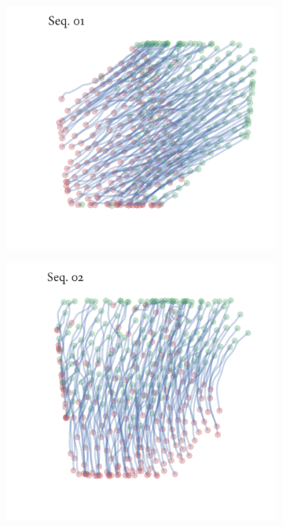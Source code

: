 \begin{figure}[h]
	\begin{subfigure}[t]{0.5\textwidth}
		\centering
		\includegraphics{streamline_sequence01.pdf}
	\end{subfigure}%
	\begin{subfigure}[t]{0.5\textwidth}
		\centering
		\includegraphics{streamline_sequence02.pdf}
	\end{subfigure}
	\begin{subfigure}[t]{0.5\textwidth}
		\centering

\end{subfigure}
\end{figure}
